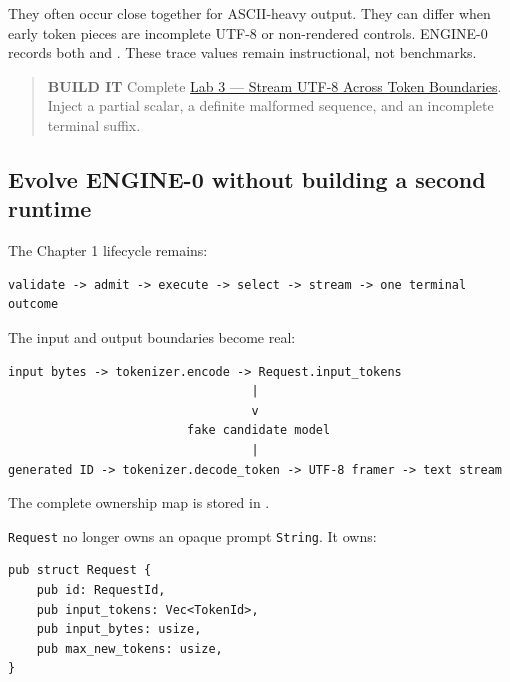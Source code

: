 \documentclass[
  10pt,
]{article}
\begin{document}
They often occur close together for ASCII-heavy output. They can differ
when early token pieces are incomplete UTF-8 or non-rendered controls.
ENGINE-0 records both \texttt{} and
\texttt{}. These trace values remain
instructional, not benchmarks.

\begin{quote}
\textbf{BUILD IT} Complete
\href{https://github.com/hermonai/inside-the-llm-engine/blob/astra-visual-rewrite/labs/lab-03-stream-utf8-across-tokens.md}{Lab
3 --- Stream UTF-8 Across Token Boundaries}. Inject a partial scalar, a
definite malformed sequence, and an incomplete terminal suffix.
\end{quote}

\subsection{Evolve ENGINE-0 without building a second
runtime}\label{evolve-engine-0-without-building-a-second-runtime}

The Chapter 1 lifecycle remains:

\begin{verbatim}
validate -> admit -> execute -> select -> stream -> one terminal outcome
\end{verbatim}

The input and output boundaries become real:

\begin{verbatim}
input bytes -> tokenizer.encode -> Request.input_tokens
                                  |
                                  v
                         fake candidate model
                                  |
generated ID -> tokenizer.decode_token -> UTF-8 framer -> text stream
\end{verbatim}

The complete ownership map is stored in
\href{https://github.com/hermonai/inside-the-llm-engine/blob/astra-visual-rewrite/diagrams/tokenizer/engine0-token-ownership.txt}{\texttt{}}.

\texttt{Request} no longer owns an opaque prompt \texttt{String}. It
owns:

\begin{verbatim}
pub struct Request {
    pub id: RequestId,
    pub input_tokens: Vec<TokenId>,
    pub input_bytes: usize,
    pub max_new_tokens: usize,
}
\end{verbatim}
\end{document}
